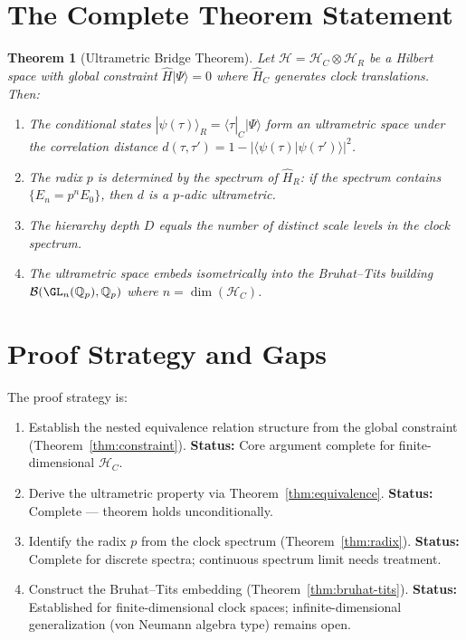 \documentclass[12pt,a4paper]{article}
\newtheorem{theorem}{Theorem}[section]
\newcommand{\Qp}{\mathbb{Q}_p}
\newcommand{\cH}{\mathcal{H}}
\newcommand{\cB}{\mathcal{B}}
\newcommand{\abs}[1]{\lvert#1\rvert}
\newcommand{\ket}[1]{|#1\rangle}
\newcommand{\bra}[1]{\langle #1|}
\newcommand{\braket}[2]{\langle #1 | #2 \rangle}
\begin{document}
\section{The Complete Theorem Statement}

\begin{theorem}[Ultrametric Bridge Theorem]\label{thm:main}
Let $\cH = \cH_C \otimes \cH_R$ be a Hilbert space with global constraint $\hat{H}\ket{\Psi}=0$ where $\hat{H}_C$ generates clock translations. Then:
\begin{enumerate}[label=(\arabic*),nosep]
\item The conditional states $\ket{\psi(\tau)}_R = \bra{\tau}_C \ket{\Psi}$ form an ultrametric space under the correlation distance $d(\tau,\tau') = 1 - \abs{\braket{\psi(\tau)}{\psi(\tau')}}^2$.
\item The radix $p$ is determined by the spectrum of $\hat{H}_R$: if the spectrum contains $\{E_n = p^n E_0\}$, then $d$ is a $p$-adic ultrametric.
\item The hierarchy depth $D$ equals the number of distinct scale levels in the clock spectrum.
\item The ultrametric space embeds isometrically into the Bruhat--Tits building $\cB(\GL_n(\Qp),\Qp)$ where $n = \dim(\cH_C)$.
\end{enumerate}
\end{theorem}

\section{Proof Strategy and Gaps}

The proof strategy is:
\begin{enumerate}[nosep]
\item[Stage 1:] Establish the nested equivalence relation structure from the global constraint (Theorem~\ref{thm:constraint}). \textbf{Status:} Core argument complete for finite-dimensional $\cH_C$.
\item[Stage 2:] Derive the ultrametric property via Theorem~\ref{thm:equivalence}. \textbf{Status:} Complete --- theorem holds unconditionally.
\item[Stage 3:] Identify the radix $p$ from the clock spectrum (Theorem~\ref{thm:radix}). \textbf{Status:} Complete for discrete spectra; continuous spectrum limit needs treatment.
\item[Stage 4:] Construct the Bruhat--Tits embedding (Theorem~\ref{thm:bruhat-tits}). \textbf{Status:} Established for finite-dimensional clock spaces; infinite-dimensional generalization (von Neumann algebra type) remains open.
\end{enumerate}
\end{document}
